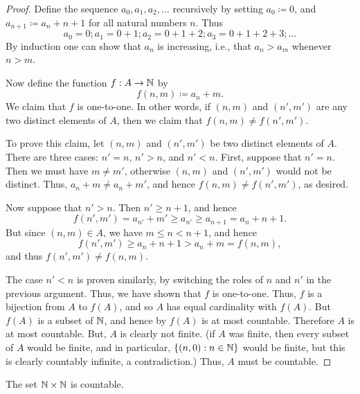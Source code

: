 \begin{proof}
  Define the sequence \(a_0, a_1, a_2, \dots\) recursively by setting \(a_0 \coloneqq 0\), and \(a_{n + 1} \coloneqq a_n + n + 1\) for all natural numbers \(n\).
  Thus
  \[
    a_0 = 0; a_1 = 0 + 1; a_2 = 0 + 1 + 2; a_3 = 0 + 1 + 2 + 3; \dots
  \]
  By induction one can show that \(a_n\) is increasing, i.e., that \(a_n > a_m\) whenever \(n > m\).

  Now define the function \(f : A \to \mathbb{N}\) by
  \[
    f(n, m) \coloneqq a_n + m.
  \]
  We claim that \(f\) is one-to-one.
  In other words, if \((n, m)\) and \((n', m')\) are any two distinct elements of \(A\), then we claim that \(f(n, m) \neq f(n', m')\).

  To prove this claim, let \((n, m)\) and \((n', m')\) be two distinct elements of \(A\).
  There are three cases: \(n' = n\), \(n' > n\), and \(n' < n\).
  First, suppose that \(n' = n\).
  Then we must have \(m \neq m'\), otherwise \((n, m)\) and \((n', m')\) would not be distinct.
  Thus, \(a_n + m \neq a_n + m'\), and hence \(f(n, m) \neq f(n', m')\), as desired.

  Now suppose that \(n' > n\).
  Then \(n' \geq n + 1\), and hence
  \[
    f(n', m') = a_{n'} + m' \geq a_{n'} \geq a_{n + 1} = a_n + n + 1.
  \]
  But since \((n, m) \in A\), we have \(m \leq n < n + 1\), and hence
  \[
    f(n', m') \geq a_n + n + 1 > a_n + m = f(n, m),
  \]
  and thus \(f(n', m') \neq f(n, m)\).

  The case \(n' < n\) is proven similarly, by switching the roles of \(n\) and \(n'\) in the previous argument.
  Thus, we have shown that \(f\) is one-to-one.
  Thus, \(f\) is a bijection from \(A\) to \(f(A)\), and so \(A\) has equal cardinality with \(f(A)\).
  But \(f(A)\) is a subset of \(\mathbb{N}\), and hence by  \(f(A)\) is at most countable.
  Therefore \(A\) is at most countable.
  But, \(A\) is clearly not finite.
  (if \(A\) was finite, then every subset of \(A\) would be finite, and in particular, \(\left\lbrace(n, 0) : n \in \mathbb{N}\right\rbrace\) would be finite, but this is clearly countably infinite, a contradiction.)
  Thus, \(A\) must be countable.
\end{proof}

\begin{cor}\label{i:8.1.13}
  The set \(\mathbb{N} \times \mathbb{N}\) is countable.
\end{cor}

